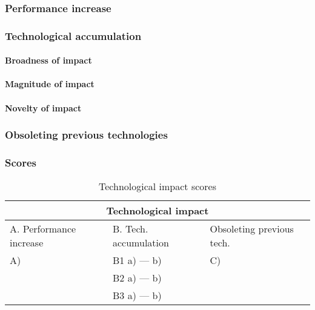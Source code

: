 \subsubsection{Performance increase}

\subsubsection{Technological accumulation}
\paragraph{Broadness of impact}

\paragraph{Magnitude of impact}

\paragraph{Novelty of impact}

\subsubsection{Obsoleting previous technologies}

\subsubsection{Scores}
\begin{table}[h]
\centering
\begin{tabular}{l l l}
\hline
\multicolumn{3}{|c|}{Technological impact} \\
\hline
A. Performance increase & B. Tech. accumulation & Obsoleting previous tech.\\
A)   & B1 a)  --- b)  & C) \\ 
     & B2 a)  --- b)  & \\
     & B3 a)  --- b)  & \\
\hline
\end{tabular}
\caption{Technological impact scores}
\label{tbl:impactscores5}
\end{table}